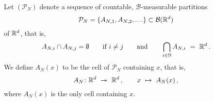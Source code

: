 Let $
\left(
\mathcal{P}_N
\right)
$
denote a sequence of countable, $\mathcal{B}$-measurable partitions 
\begin{align*}
\mathcal{P}_N= \left\{
  A_{N,1},
  A_{N,2},
  \ldots
\right\}
\subset \mathcal{B}(\mathbb{R}^d)
\end{align*}
of $\mathbb{R}^d$, that is, 
\begin{align*}
  A_{N,i}\cap A_{N,j}=\emptyset
  \qquad
  \text{if}\ i\neq j
  \qquad
  \text{and}
  \qquad 
  \bigcap_{i\in\mathbb{N}}A_{N,i}
  \ 
  =
  \ 
  \R^d
  \,.
\end{align*}
We define
$ A_N(x) $ to be the cell of $ \mathcal{P}_N $ containing $x$, that is,
\begin{align*}
  A_N
  \colon
  \R^d 
  \ 
  \twoheadrightarrow 
  \ 
  \R^d  
  \,,\qquad
  x
  \ 
  \mapsto
  \ 
  A_N(x)
  \,,
\end{align*}
where $A_N(x)$ is the only cell containing $x$. 

